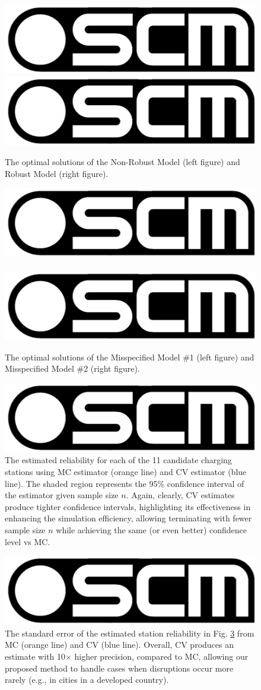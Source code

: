\documentclass[preprint]{oscmjournal}
\theoremstyle{remark}
\begin{document}
\begin{figure}
    \centering   
    \includegraphics[width=0.25\linewidth]{figs/oscm.png}
    \includegraphics[width=0.25\linewidth]{figs/oscm.png}
    \caption{The optimal solutions of the Non-Robust Model (left figure) and Robust Model (right figure).}
    \label{fig:nrm_rm}
\end{figure}

\begin{figure}
    \centering   
    \includegraphics[width=0.25\linewidth]{figs/oscm.png}~~\includegraphics[width=0.25\linewidth]{figs/oscm.png}
    \caption{The optimal solutions of the Misspecified Model \#1 (left figure) and Misspecified Model \#2 (right figure).}
    \label{fig:miss1_miss2}
\end{figure}



\begin{figure}
    \centering
    \includegraphics[width=0.25\linewidth]{figs/oscm.png}
    \caption{The estimated reliability for each of the 11 candidate charging stations using MC estimator (orange line) and CV estimator (blue line). The shaded region represents the 95\% confidence interval of the estimator given sample size $n$. Again, clearly, CV estimates produce tighter confidence intervals, highlighting its effectiveness in enhancing the simulation efficiency, allowing terminating with fewer sample size $n$ while achieving the same (or even better) confidence level vs MC.}
    \label{fig:estimation}
\end{figure}

\begin{figure}
    \centering
    \includegraphics[width=0.25\linewidth]{figs/oscm.png}
    \caption{The standard error of the estimated station reliability in Fig. \ref{fig:estimation} from MC (orange line) and CV (blue line). Overall, CV produces an estimate with 10$\times$ higher precision, compared to MC, allowing our proposed method to handle cases when disruptions occur more rarely (e.g., in cities in a developed country).}
    \label{fig:estimation_error}
\end{figure}
\end{document}
